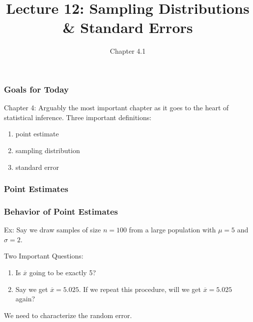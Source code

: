 \documentclass[slides]{beamer}
\title{Lecture 12: Sampling Distributions \& Standard Errors}
\author{Chapter 4.1}
\date{}
\newcommand{\blue}[1]{\textcolor{blue2}{#1}}
\newcommand{\xbar}{\overline{x}}
\begin{document}
\begin{frame}[fragile]
\titlepage
\end{frame}


\begin{frame}[fragile]
\frametitle{Goals for Today}

Chapter 4:  Arguably the most important chapter as it goes to the heart of statistical inference.  Three important definitions:

\vspace{0.5cm}

\begin{enumerate}
\item \blue{point estimate}
\item \blue{sampling distribution}
\item \blue{standard error}
\end{enumerate}


\end{frame}


\begin{frame}[fragile]
\frametitle{Point Estimates}

%
%
%
%

\end{frame}


\begin{frame}[fragile]
\frametitle{Behavior of Point Estimates}
Ex:  Say we draw samples of size $n=100$ from a large population with $\mu=5$ and $\sigma=2$.

\pause \vskip 0.5cm

\blue{Two Important Questions}:
\begin{enumerate}
\pause \item Is $\xbar$ going to be exactly 5?
\pause \item Say we get $\overline{x}=5.025$.  If we repeat this procedure, will we get $\overline{x} = 5.025$ again?
\end{enumerate}

\pause \vskip 0.5cm

We need to characterize the random error.

\end{frame}
\end{document}
